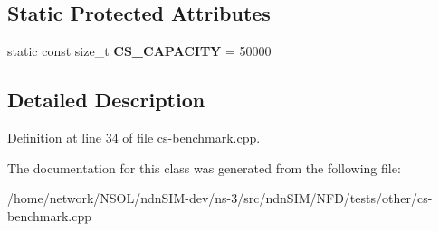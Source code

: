 \subsection*{Static Protected Attributes}
\begin{DoxyCompactItemize}
\item 
static const size\+\_\+t {\bfseries C\+S\+\_\+\+C\+A\+P\+A\+C\+I\+TY} = 50000\hypertarget{classnfd_1_1tests_1_1CsBenchmarkFixture_a3edd057ad90c7e2d82091c088a5a16cf}{}\label{classnfd_1_1tests_1_1CsBenchmarkFixture_a3edd057ad90c7e2d82091c088a5a16cf}

\end{DoxyCompactItemize}


\subsection{Detailed Description}


Definition at line 34 of file cs-\/benchmark.\+cpp.



The documentation for this class was generated from the following file\+:\begin{DoxyCompactItemize}
\item 
/home/network/\+N\+S\+O\+L/ndn\+S\+I\+M-\/dev/ns-\/3/src/ndn\+S\+I\+M/\+N\+F\+D/tests/other/cs-\/benchmark.\+cpp\end{DoxyCompactItemize}
